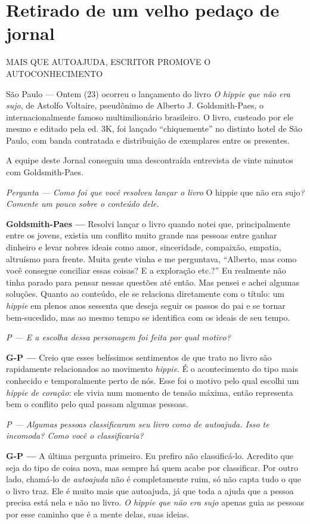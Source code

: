 \chapter{Retirado de um velho pedaço de jornal}

{\Large MAIS QUE AUTOAJUDA, ESCRITOR PROMOVE O AUTOCONHECIMENTO}

São Paulo --- Ontem (23) ocorreu o lançamento do livro \emph{O hippie que não era sujo}, de Astolfo Voltaire, pseudônimo de Alberto J. Goldsmith-Paes, o internacionalmente famoso multimilionário brasileiro. O livro, custeado por ele mesmo e editado pela ed. 3K, foi lançado ``chiquemente'' no distinto hotel de São Paulo, com banda contratada e distribuição de exemplares entre os presentes.

A equipe deste Jornal conseguiu uma descontraída entrevista de vinte minutos com Goldsmith-Paes.

\emph{Pergunta --- Como foi que você resolveu lançar o livro} O hippie que não era sujo\emph{? Comente um pouco sobre o conteúdo dele.}

\textbf{Goldsmith-Paes ---} Resolvi lançar o livro quando notei que, principalmente entre os jovens, existia um conflito muito grande nas pessoas entre ganhar dinheiro e levar nobres ideais como amor, sinceridade, compaixão, empatia, altruísmo para frente. Muita gente vinha e me perguntava, ``Alberto, mas como você consegue conciliar essas coisas? E a exploração etc.?'' Eu realmente não tinha parado para pensar nessas questões até então. Mas pensei e achei algumas soluções. Quanto ao conteúdo, ele se relaciona diretamente com o título: um \emph{hippie} em plenos anos sessenta que deseja seguir os passos do pai e se tornar bem-sucedido, mas ao mesmo tempo se identifica com os ideais de seu tempo.

\emph{P --- E a escolha dessa personagem foi feita por qual motivo?}

\textbf{G-P ---} Creio que esses belíssimos sentimentos de que trato no livro são rapidamente relacionados ao movimento \emph{hippie}. É o acontecimento do tipo mais conhecido e temporalmente perto de nós. Esse foi o motivo pelo qual escolhi um \emph{hippie de coração}: ele vivia num momento de tensão máxima, então representa bem o conflito pelo qual passam algumas pessoas.

\emph{P --- Algumas pessoas classificaram seu livro como de \emph{autoajuda}. Isso te incomoda? Como você o classificaria?}

\textbf{G-P ---} A última pergunta primeiro. Eu prefiro não classificá-lo. Acredito que seja do tipo de coisa nova, mas sempre há quem acabe por classificar. Por outro lado, chamá-lo de \emph{autoajuda} não é completamente ruim, só não capta tudo o que o livro traz. Ele é muito mais que autoajuda, já que toda a ajuda que a pessoa precisa está nela e não no livro. \emph{O hippie que não era sujo} apenas guia as pessoas por esse caminho que é a mente delas, suas ideias.

